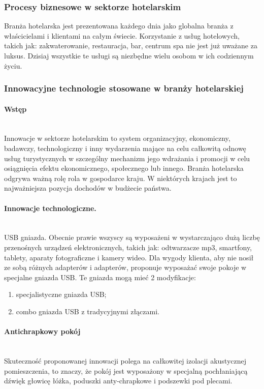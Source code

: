 \documentclass[a4paper, 12pt]{article}
\begin{document}
\subsubsection{Procesy biznesowe w sektorze hotelarskim}
Branża hotelarska jest prezentowana każdego dnia jako globalna branża z właścicielami i klientami na całym świecie. Korzystanie z usług hotelowych, takich jak: zakwaterowanie, restauracja, bar, centrum spa nie jest już uważane za luksus. Dzisiaj wszystkie te usługi są niezbędne wielu osobom w ich codziennym życiu.\newline

\subsubsection{Innowacyjne technologie stosowane w branży hotelarskiej}
\paragraph{Wstęp}\mbox{}\\
\hspace*{1cm}Innowacje w sektorze hotelarskim to system organizacyjny, ekonomiczny, badawczy, technologiczny i inny wydarzenia mające na celu całkowitą odnowę usług turystycznych w szczególny mechanizm jego wdrażania i promocji w celu osiągnięcia efektu ekonomicznego, społecznego lub innego. Branża hotelarska odgrywa ważną rolę rola w gospodarce kraju. W niektórych krajach jest to najważniejsza pozycja dochodów w budżecie państwa. 
\paragraph{Innowacje technologiczne.}\mbox{}\\
\hspace*{1cm} USB gniazda. Obecnie prawie wszyscy są wyposażeni w wystarczająco dużą liczbę przenośnych urządzeń elektronicznych, takich jak:
odtwarzacze mp3, smartfony, tablety, aparaty fotograficzne i kamery wideo. Dla wygody klienta, aby nie nosił ze sobą różnych adapterów i adapterów, proponuje wyposażać swoje pokoje w specjalne gniazda USB. Te gniazda mogą mieć 2 modyfikacje:
\begin{enumerate}
	\item specjalistyczne gniazda USB;
	\item combo gniazda USB z tradycyjnymi złączami.
\end{enumerate}
\paragraph{Antichrapkowy pokój}\mbox{}\\
\hspace*{1cm} Skuteczność proponowanej innowacji polega na całkowitej izolacji akustycznej pomieszczenia, to znaczy, że pokój jest wyposażony w specjalną pochłaniającą dźwięk głowicę łóżka, poduszki anty-chrapkowe i podszewki pod plecami.
\end{document}
